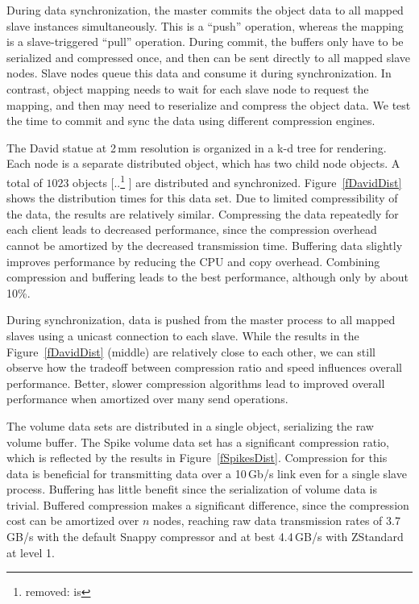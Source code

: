 \documentclass[10pt,journal,compsoc]{IEEEtran}
\newcommand{\fig}[1]{Figure~\ref{#1}}
\providecommand{\DIFaddtex}[1]{{\protect\color{blue} \sf #1}} %
\providecommand{\DIFdeltex}[1]{{\protect\color{red} [..\footnote{removed: #1} ]}} %
\providecommand{\DIFaddbegin}{} %
\providecommand{\DIFaddend}{} %
\providecommand{\DIFdelbegin}{} %
\providecommand{\DIFdelend}{} %
\providecommand{\DIFadd}[1]{\texorpdfstring{\DIFaddtex{#1}}{#1}} %
\providecommand{\DIFdel}[1]{\texorpdfstring{\DIFdeltex{#1}}{}} %
\newcommand{\DIFscaledelfig}{0.5}
\newlength{\DIFdelgraphicswidth} %
\newlength{\DIFdelgraphicsheight} %
\newcommand{\DIFaddincludegraphics}[2][]{{\color{blue}\fbox{\DIFOincludegraphics[#1]{#2}}}} %
\newcommand{\DIFdelincludegraphics}[2][]{%
\sbox{\DIFdelgraphicsbox}{\DIFOincludegraphics[#1]{#2}}%
\settoboxwidth{\DIFdelgraphicswidth}{\DIFdelgraphicsbox} %
\settoboxtotalheight{\DIFdelgraphicsheight}{\DIFdelgraphicsbox} %
\scalebox{\DIFscaledelfig}{%
\parbox[b]{\DIFdelgraphicswidth}{\usebox{\DIFdelgraphicsbox}\\[-\baselineskip] \rule{\DIFdelgraphicswidth}{0em}}\llap{\resizebox{\DIFdelgraphicswidth}{\DIFdelgraphicsheight}{%
\setlength{\unitlength}{\DIFdelgraphicswidth}%
\begin{picture}(1,1)%
\thicklines\linethickness{2pt} %
{\color[rgb]{1,0,0}\put(0,0){\framebox(1,1){}}}%
{\color[rgb]{1,0,0}\put(0,0){\line( 1,1){1}}}%
{\color[rgb]{1,0,0}\put(0,1){\line(1,-1){1}}}%
\end{picture}%
}\hspace*{3pt}}} %
} %
\DeclareRobustCommand{\DIFaddbegin}{\DIFOaddbegin \let\includegraphics\DIFaddincludegraphics} %
\DeclareRobustCommand{\DIFaddend}{\DIFOaddend \let\includegraphics\DIFOincludegraphics} %
\DeclareRobustCommand{\DIFdelbegin}{\DIFOdelbegin \let\includegraphics\DIFdelincludegraphics} %
\DeclareRobustCommand{\DIFdelend}{\DIFOaddend \let\includegraphics\DIFOincludegraphics} %
\begin{document}
During data synchronization, the master commits the object data to all mapped
slave instances simultaneously. This is a ``push'' operation, whereas the
mapping is a slave-triggered ``pull'' operation. \DIFaddbegin \DIFadd{During commit, the buffers
only have to be serialized and compressed once, and then can be sent directly
to all mapped slave nodes. }\DIFaddend Slave nodes queue this data and consume it during
synchronization. \DIFaddbegin \DIFadd{In contrast, object mapping needs to wait for each slave node
to request the mapping, and then may need to reserialize and compress the
object data. }\DIFaddend We test the time to commit and sync the data using different
compression engines.

The David statue at 2\,mm resolution is organized in a k-d tree for rendering. Each
node is a separate distributed object, which has two child node objects. A
total of $1023$ objects \DIFdelbegin \DIFdel{is }\DIFdelend \DIFaddbegin \DIFadd{are }\DIFaddend distributed and synchronized. \fig{fDavidDist} shows
the distribution times for this data set. Due to limited compressibility of the
data, the results are relatively similar. Compressing the data repeatedly for
each client leads to decreased performance, since the compression overhead
cannot be amortized by the decreased transmission time. Buffering data slightly
improves performance by reducing the CPU and copy overhead. Combining
compression and buffering leads to the best performance, although only by about
10\%.

During synchronization, data is pushed from the master process to all mapped
slaves using a unicast connection to each slave. While the results in the
\fig{fDavidDist} (middle) are relatively close to each other, we can still
observe how the tradeoff between compression ratio and speed influences overall
performance. Better, slower compression algorithms lead to improved overall
performance when amortized over many send operations.

The volume data sets are distributed in a single object, serializing the raw
volume buffer. The Spike volume data set has a significant compression ratio,
which is reflected by the results in \fig{fSpikesDist}. Compression for this
data is beneficial for transmitting data over a 10\,Gb/s link even for a single
slave process. Buffering has little benefit since the serialization of volume
data is trivial. Buffered compression makes a significant difference, since the
compression cost can be amortized over $n$ nodes, reaching raw data transmission
rates of 3.7\,GB/s with the default Snappy compressor and at best 4.4\,GB/s with
ZStandard at level 1.
\end{document}
